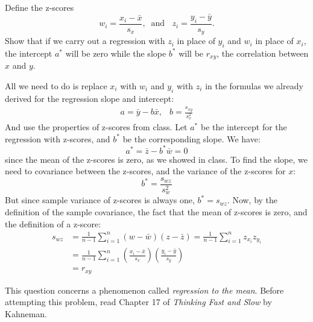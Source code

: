 \documentclass[addpoints,12pt]{exam}\usepackage[]{graphicx}\usepackage[]{color}
\begin{document}
\begin{questions}
  \question Define the z-scores 
  \[w_i = \frac{x_i - \bar{x}}{s_x}, \;\;\mbox{and }\;\; z_i = \frac{y_i - \bar{y}}{s_y}.\]
  Show that if we carry out a regression with $z_i$ in place of $y_i$ and $w_i$ in place of $x_i$, the intercept $a^*$ will be zero while the slope $b^*$ will be $r_{xy}$, the correlation between $x$ and $y$.
    \begin{solution}
     All we need to do is replace $x_i$ with $w_i$ and $y_i$ with $z_i$ in the formulas we already derived for the regression slope and intercept:
     		$$\begin{array}{lr}a = \bar{y} - b\bar{x}, & b = \displaystyle \frac{s_{xy}}{s_x^2}\end{array}$$
     		And use the properties of z-scores from class. Let $a^*$ be the intercept for the regression with z-scores, and $b^*$ be the corresponding slope. We have:
        $$a^* = \bar{z} - b^* \bar{w} = 0$$
     	 	since the mean of the z-scores is zero, as we showed in class. To find the slope, we need to covariance between the z-scores, and the variance of the z-scores for $x$:
     	 		$$b^* = \frac{s_{wz}}{s_{w}^2}$$
     	 		But since sample variance of z-scores is always one, $b^* = s_{wz}$. Now, by the definition of the sample covariance, the fact that the mean of z-scores is zero, and the definition of a z-score:
     	 		\begin{align*}
     	 		s_{wz} &= \frac{1}{n-1} \sum_{i=1}^n (w - \bar{w})(z - \bar{z}) = \frac{1}{n-1} \sum_{i=1}^n z_{x_i}z_{y_i}\\
     	 		&= \frac{1}{n-1} \sum_{i=1}^n \left(\frac{x_i - \bar{x}}{s_x}\right)\left(\frac{y_i - \bar{y}}{s_y}\right)\\
     	 		&= r_{xy}
     	 		\end{align*}
    \end{solution}

  \question This question concerns a phenomenon called \emph{regression to the mean}. Before attempting this problem, read Chapter 17 of \emph{Thinking Fast and Slow} by Kahneman.
  \begin{parts}

\end{parts}
\end{questions}
\end{document}
